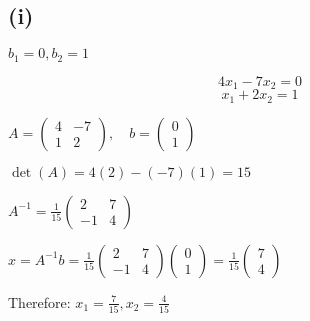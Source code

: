 \subsection*{(i)} $b_1 = 0, b_2 = 1$

\[
	4x_1 - 7x_2 = 0
\]
\[
	x_1 + 2x_2 = 1
\]

$A = \begin{pmatrix}
	4 & -7 \\
	1 & 2
\end{pmatrix}, \quad b = \begin{pmatrix}
	0 \\
	1
\end{pmatrix}$

$\det(A) = 4(2) - (-7)(1) = 15$

$A^{-1} = \frac{1}{15}\begin{pmatrix}
	2 & 7 \\
	-1 & 4
\end{pmatrix}$

$x = A^{-1}b = \frac{1}{15}\begin{pmatrix}
	2 & 7 \\
	-1 & 4
\end{pmatrix}\begin{pmatrix}
	0 \\
	1
\end{pmatrix} = \frac{1}{15}\begin{pmatrix}
	7 \\
	4
\end{pmatrix}$

Therefore: $x_1 = \frac{7}{15}, x_2 = \frac{4}{15}$